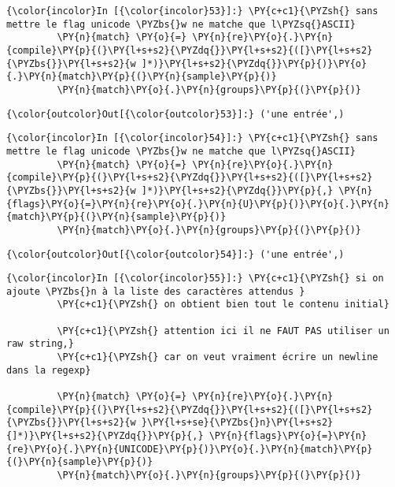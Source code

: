     \begin{Verbatim}[commandchars=\\\{\},frame=single,framerule=0.3mm,rulecolor=\color{cellframecolor}]
{\color{incolor}In [{\color{incolor}53}]:} \PY{c+c1}{\PYZsh{} sans mettre le flag unicode \PYZbs{}w ne matche que l\PYZsq{}ASCII}
         \PY{n}{match} \PY{o}{=} \PY{n}{re}\PY{o}{.}\PY{n}{compile}\PY{p}{(}\PY{l+s+s2}{\PYZdq{}}\PY{l+s+s2}{([}\PY{l+s+s2}{\PYZbs{}}\PY{l+s+s2}{w ]*)}\PY{l+s+s2}{\PYZdq{}}\PY{p}{)}\PY{o}{.}\PY{n}{match}\PY{p}{(}\PY{n}{sample}\PY{p}{)}
         \PY{n}{match}\PY{o}{.}\PY{n}{groups}\PY{p}{(}\PY{p}{)}
\end{Verbatim}


\begin{Verbatim}[commandchars=\\\{\},frame=single,framerule=0.3mm,rulecolor=\color{cellframecolor}]
{\color{outcolor}Out[{\color{outcolor}53}]:} ('une entrée',)
\end{Verbatim}
            
    \begin{Verbatim}[commandchars=\\\{\},frame=single,framerule=0.3mm,rulecolor=\color{cellframecolor}]
{\color{incolor}In [{\color{incolor}54}]:} \PY{c+c1}{\PYZsh{} sans mettre le flag unicode \PYZbs{}w ne matche que l\PYZsq{}ASCII}
         \PY{n}{match} \PY{o}{=} \PY{n}{re}\PY{o}{.}\PY{n}{compile}\PY{p}{(}\PY{l+s+s2}{\PYZdq{}}\PY{l+s+s2}{([}\PY{l+s+s2}{\PYZbs{}}\PY{l+s+s2}{w ]*)}\PY{l+s+s2}{\PYZdq{}}\PY{p}{,} \PY{n}{flags}\PY{o}{=}\PY{n}{re}\PY{o}{.}\PY{n}{U}\PY{p}{)}\PY{o}{.}\PY{n}{match}\PY{p}{(}\PY{n}{sample}\PY{p}{)}
         \PY{n}{match}\PY{o}{.}\PY{n}{groups}\PY{p}{(}\PY{p}{)}
\end{Verbatim}


\begin{Verbatim}[commandchars=\\\{\},frame=single,framerule=0.3mm,rulecolor=\color{cellframecolor}]
{\color{outcolor}Out[{\color{outcolor}54}]:} ('une entrée',)
\end{Verbatim}
            
    \begin{Verbatim}[commandchars=\\\{\},frame=single,framerule=0.3mm,rulecolor=\color{cellframecolor}]
{\color{incolor}In [{\color{incolor}55}]:} \PY{c+c1}{\PYZsh{} si on ajoute \PYZbs{}n à la liste des caractères attendus }
         \PY{c+c1}{\PYZsh{} on obtient bien tout le contenu initial}
         
         \PY{c+c1}{\PYZsh{} attention ici il ne FAUT PAS utiliser un raw string,}
         \PY{c+c1}{\PYZsh{} car on veut vraiment écrire un newline dans la regexp}
         
         \PY{n}{match} \PY{o}{=} \PY{n}{re}\PY{o}{.}\PY{n}{compile}\PY{p}{(}\PY{l+s+s2}{\PYZdq{}}\PY{l+s+s2}{([}\PY{l+s+s2}{\PYZbs{}}\PY{l+s+s2}{w }\PY{l+s+se}{\PYZbs{}n}\PY{l+s+s2}{]*)}\PY{l+s+s2}{\PYZdq{}}\PY{p}{,} \PY{n}{flags}\PY{o}{=}\PY{n}{re}\PY{o}{.}\PY{n}{UNICODE}\PY{p}{)}\PY{o}{.}\PY{n}{match}\PY{p}{(}\PY{n}{sample}\PY{p}{)}
         \PY{n}{match}\PY{o}{.}\PY{n}{groups}\PY{p}{(}\PY{p}{)}
\end{Verbatim}


